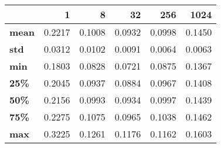 \begin{tabular}{lrrrrr}
\toprule
{} &       1 &       8 &      32 &     256 &    1024 \\
\midrule
\textbf{mean} &  0.2217 &  0.1008 &  0.0932 &  0.0998 &  0.1450 \\
\textbf{std } &  0.0312 &  0.0102 &  0.0091 &  0.0064 &  0.0063 \\
\textbf{min } &  0.1803 &  0.0828 &  0.0721 &  0.0875 &  0.1367 \\
\textbf{25\% } &  0.2045 &  0.0937 &  0.0884 &  0.0967 &  0.1408 \\
\textbf{50\% } &  0.2156 &  0.0993 &  0.0934 &  0.0997 &  0.1439 \\
\textbf{75\% } &  0.2275 &  0.1075 &  0.0965 &  0.1038 &  0.1462 \\
\textbf{max } &  0.3225 &  0.1261 &  0.1176 &  0.1162 &  0.1603 \\
\bottomrule
\end{tabular}
